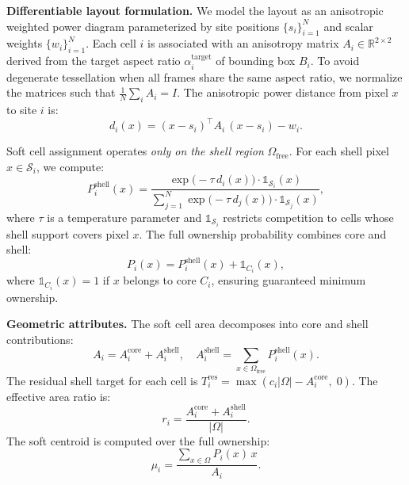 \vspace{1mm}
\noindent\textbf{Differentiable layout formulation.}
We model the layout as an anisotropic weighted power diagram parameterized by site positions $\{s_i\}_{i=1}^N$ and scalar weights $\{w_i\}_{i=1}^N$. Each cell $i$ is associated with an anisotropy matrix $A_i \in \mathbb{R}^{2 \times 2}$ derived from the target aspect ratio $\alpha_i^{\text{target}}$ of bounding box $B_i$. To avoid degenerate tessellation when all frames share the same aspect ratio, we normalize the matrices such that $\frac{1}{N}\sum_i A_i = I$. The anisotropic power distance from pixel $x$ to site $i$ is:
\begin{equation}
d_i(x) = (x - s_i)^\top A_i\,(x - s_i) - w_i.
\end{equation}

Soft cell assignment operates \emph{only on the shell region} $\Omega_{\text{free}}$. For each shell pixel $x \in \mathcal{S}_i$, we compute:
\begin{equation}
P_i^{\text{shell}}(x) = \frac{\exp\bigl(-\tau\, d_i(x)\bigr) \cdot \mathbb{1}_{\mathcal{S}_i}(x)}
              {\sum_{j=1}^{N} \exp\bigl(-\tau\, d_j(x)\bigr) \cdot \mathbb{1}_{\mathcal{S}_j}(x)},
\end{equation}
where $\tau$ is a temperature parameter and $\mathbb{1}_{\mathcal{S}_i}$ restricts competition to cells whose shell support covers pixel $x$. The full ownership probability combines core and shell:
\begin{equation}
P_i(x) = P_i^{\text{shell}}(x) + \mathbb{1}_{C_i}(x),
\end{equation}
where $\mathbb{1}_{C_i}(x) = 1$ if $x$ belongs to core $C_i$, ensuring guaranteed minimum ownership.

\vspace{1mm}
\noindent\textbf{Geometric attributes.}
The soft cell area decomposes into core and shell contributions:
\begin{equation}
A_i = A_i^{\text{core}} + A_i^{\text{shell}}, \quad
A_i^{\text{shell}} = \sum_{x \in \Omega_{\text{free}}} P_i^{\text{shell}}(x).
\end{equation}
The residual shell target for each cell is $T_i^{\text{res}} = \max(c_i |\Omega| - A_i^{\text{core}},\; 0)$. The effective area ratio is:
\begin{equation}
r_i = \frac{A_i^{\text{core}} + A_i^{\text{shell}}}{|\Omega|}.
\end{equation}
The soft centroid is computed over the full ownership:
\begin{equation}
\mu_i = \frac{\sum_{x \in \Omega} P_i(x)\,x}{A_i}.
\end{equation}

